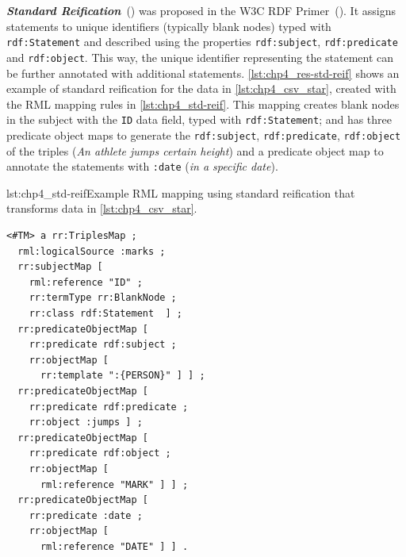

\noindent\textbf{\textit{Standard Reification}}~(\cite{manola2004rdf}) was proposed in the W3C RDF Primer~(\cite{manola2004rdf}).
It assigns statements to unique identifiers (typically blank nodes) typed with \texttt{rdf:Statement} and described using the properties \texttt{rdf:subject}, \texttt{rdf:predicate} and \texttt{rdf:object}.
This way, the unique identifier representing the statement can be further annotated with additional statements. \cref{lst:chp4_res-std-reif} shows an example of standard reification for the data in \cref{lst:chp4_csv_star}, created with the RML mapping rules in \cref{lst:chp4_std-reif}. 
This mapping creates blank nodes in the subject with the \texttt{ID} data field, typed with \texttt{rdf:Statement}; and has three predicate object maps to generate the \texttt{rdf:subject}, \texttt{rdf:predicate}, \texttt{rdf:object} of the triples (\textit{An athlete jumps certain height}) and a predicate object map to annotate the statements with \texttt{:date} (\textit{in a specific date}).




\begin{minipage}{\linewidth}
\begin{captionedlisting}{lst:chp4_std-reif}{Example RML mapping using standard reification that transforms data in \cref{lst:chp4_csv_star}.}
\centering
\begin{multicols}{2}
{\begin{lstlisting}[basicstyle=\ttfamily\small,label={list:example1},columns=flexible]
<#TM> a rr:TriplesMap ;
  rml:logicalSource :marks ;
  rr:subjectMap [ 
    rml:reference "ID" ;
    rr:termType rr:BlankNode ;
    rr:class rdf:Statement  ] ;
  rr:predicateObjectMap [ 
    rr:predicate rdf:subject ;
    rr:objectMap [
      rr:template ":{PERSON}" ] ] ;
  rr:predicateObjectMap [ 
    rr:predicate rdf:predicate ;
    rr:object :jumps ] ;
  rr:predicateObjectMap [ 
    rr:predicate rdf:object ;
    rr:objectMap [
      rml:reference "MARK" ] ] ;
  rr:predicateObjectMap [ 
    rr:predicate :date ;
    rr:objectMap [
      rml:reference "DATE" ] ] .
\end{lstlisting}}
\end{multicols}
\end{captionedlisting}
\end{minipage}

